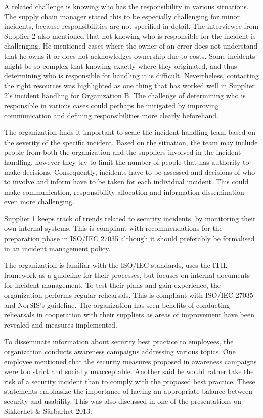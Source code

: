 A related challenge is knowing who has the responsibility in various situations. The supply chain manager stated this to be especially challenging for minor incidents, because responsibilities are not specified in detail. The interviewee from Supplier 2 also mentioned that not knowing who is responsible for the incident is challenging. He mentioned cases where the owner of an error does not understand that he owns it or does not acknowledges ownership due to costs. Some incidents might be so complex that knowing exactly where they originated, and thus determining who is responsible for handling it is difficult. Nevertheless, contacting the right resources was highlighted as one thing that has worked well in Supplier 2's incident handling for Organization B. The challenge of determining who is responsible in various cases could perhaps be mitigated by improving communication and defining responsibilities more clearly beforehand.

The organization finds it important to scale the incident handling team based on the severity of the specific incident. Based on the situation, the team may include people from both the organization and the suppliers involved in the incident handling, however they try to limit the number of people that has authority to make decisions. Consequently, incidents have to be assessed and decisions of who to involve and inform have to be taken for each individual incident. This could make communication, responsibility allocation and information dissemination even more challenging. 

Supplier 1 keeps track of trends related to security incidents, by monitoring their own internal systems. This is compliant with recommendations for the preparation phase in ISO/IEC 27035 although it should preferably be formalised in an incident management policy. 

The organization is familiar with the ISO/IEC standards, uses the ITIL framework as a guideline for their processes, but focuses on internal documents for incident management. To test their plans and gain experience, the organization performs regular rehearsals. This is compliant with ISO/IEC 27035 and NorSIS's guideline. The organization has seen benefits of conducting rehearsals in cooperation with their suppliers as areas of improvement have been revealed and measures implemented.   

To disseminate information about security best practice to employees, the organization conducts awareness campaigns addressing various topics. One employee mentioned that the security measures proposed in awareness campaigns were too strict and socially unacceptable. Another said he would rather take the risk of a security incident than to comply with the proposed best practice. These statements emphasize the importance of having an appropriate balance between security and usability. This was also discussed in one of the presentations on Sikkerhet \& S\aa rbarhet 2013:

